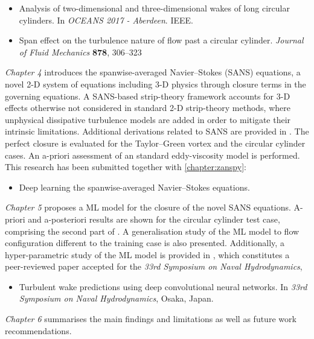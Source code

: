 \documentclass[../main.tex]{subfiles}
\begin{document}
\begin{itemize}
	\item \cite{Font2017} Analysis of two-dimensional and three-dimensional wakes of long circular cylinders. In \textit{OCEANS 2017 - Aberdeen}. IEEE.
	\item \cite{Font2019} Span effect on the turbulence nature of flow past a circular cylinder. \textit{Journal of Fluid Mechanics} \textbf{878}, 306–323
\end{itemize}

\textit{Chapter 4} introduces the spanwise-averaged Navier--Stokes (SANS) equations, a novel 2-D system of equations including 3-D physics through closure terms in the governing equations.
A SANS-based strip-theory framework accounts for 3-D effects otherwise not considered in standard 2-D strip-theory methods, where unphysical dissipative turbulence models are added in order to mitigate their intrinsic limitations.
Additional derivations related to SANS are provided in .
The perfect closure is evaluated for the Taylor--Green vortex and the circular cylinder cases.
An a-priori assessment of an standard eddy-viscosity model is performed.
This research has been submitted together with \cref{chapter:zanspy}:

\begin{itemize}
	\item \cite{Font2020b} Deep learning the spanwise-averaged Navier--Stokes equations.
\end{itemize}

\textit{Chapter 5} proposes a ML model for the closure of the novel SANS equations.
A-priori and a-posteriori results are shown for the circular cylinder test case, comprising the second part of \cite{Font2020b}.
A generalisation study of the ML model to flow configuration different to the training case is also presented.
Additionally, a hyper-parametric study of the ML model is provided in , which constitutes a peer-reviewed paper accepted for the \textit{33rd Symposium on Naval Hydrodynamics},

\begin{itemize}
	\item \cite{Font2020a} Turbulent wake predictions using deep convolutional neural networks. In \textit{33rd Symposium on Naval Hydrodynamics}, Osaka, Japan.
\end{itemize}

\textit{Chapter 6} summarises the main findings and limitations as well as future work recommendations.
\end{document}
